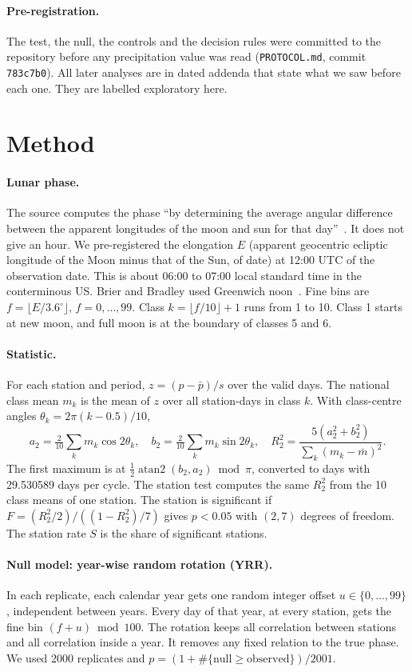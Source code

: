 \documentclass[11pt]{article}
\newcommand{\Rtwo}{R^2_2}
\begin{document}
\paragraph{Pre-registration.} The test, the null, the controls and the decision rules were committed to the repository before any precipitation value was read (\texttt{PROTOCOL.md}, commit \texttt{783c7b0}). All later analyses are in dated addenda that state what we saw before each one. They are labelled exploratory here.

\section{Method}
\paragraph{Lunar phase.} The source computes the phase ``by determining the average angular difference between the apparent longitudes of the moon and sun for that day''~\cite[para.~11]{cerveny2010}. It does not give an hour. We pre-registered the elongation $E$ (apparent geocentric ecliptic longitude of the Moon minus that of the Sun, of date) at 12:00 UTC of the observation date. This is about 06:00 to 07:00 local standard time in the conterminous US. Brier and Bradley used Greenwich noon~\cite{brier1964}. Fine bins are $f=\lfloor E/3.6^\circ\rfloor$, $f=0,\dots,99$. Class $k=\lfloor f/10\rfloor+1$ runs from 1 to 10. Class 1 starts at new moon, and full moon is at the boundary of classes 5 and 6.

\paragraph{Statistic.} For each station and period, $z=(p-\bar p)/s$ over the valid days. The national class mean $m_k$ is the mean of $z$ over all station-days in class $k$. With class-centre angles $\theta_k=2\pi(k-0.5)/10$,
\[
a_2=\tfrac{2}{10}\sum_k m_k\cos 2\theta_k,\quad b_2=\tfrac{2}{10}\sum_k m_k\sin 2\theta_k,\quad
\Rtwo=\frac{5(a_2^2+b_2^2)}{\sum_k (m_k-\bar m)^2}.
\]
The first maximum is at $\tfrac12\operatorname{atan2}(b_2,a_2)\bmod\pi$, converted to days with 29.530589 days per cycle. The station test computes the same $\Rtwo$ from the 10 class means of one station. The station is significant if $F=(\Rtwo/2)/((1-\Rtwo)/7)$ gives $p<0.05$ with $(2,7)$ degrees of freedom. The station rate $S$ is the share of significant stations.

\paragraph{Null model: year-wise random rotation (YRR).} In each replicate, each calendar year gets one random integer offset $u\in\{0,\dots,99\}$, independent between years. Every day of that year, at every station, gets the fine bin $(f+u)\bmod 100$. The rotation keeps all correlation between stations and all correlation inside a year. It removes any fixed relation to the true phase. We used 2000 replicates and $p=(1+\#\{\text{null}\ge\text{observed}\})/2001$.
\end{document}
